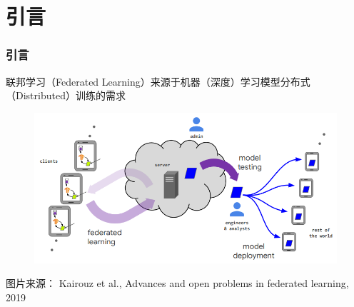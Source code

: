 \begin{frame}
\tableofcontents %
\end{frame}







\section[Introduction]{引言}


\begin{frame}
\frametitle{引言}

联邦学习（Federated Learning）来源于机器（深度）学习模型分布式（Distributed）训练的需求

\begin{figure}
    \centering
    \includegraphics[width=\textwidth,keepaspectratio]{images/fl_overview.png}
\end{figure}

{\scriptsize
图片来源：\cite{kairouz2019advances_fl} Kairouz et al., Advances and open problems in federated learning, 2019
}

\end{frame}

